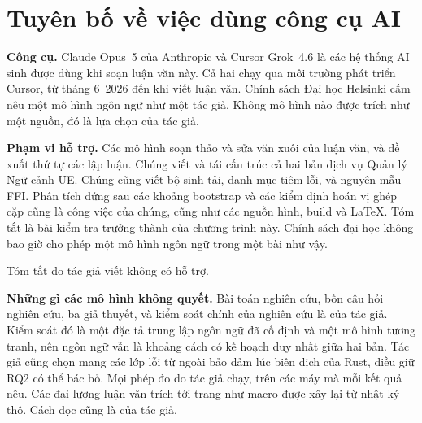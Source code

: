 \newif\ifabstractunaided
\abstractunaidedtrue
\ifabstractunaided\else
  \GenericWarning{}{ai_statement: the abstract has not been rewritten unaided.
    Not submittable. Set \noexpand\abstractunaidedtrue in ai_statement.tex once it has}%
\fi

\cleardoublepage
{}
{}
\chapter*{Tuyên bố về việc dùng công cụ AI}

\noindent\textbf{Công cụ.} Claude Opus~5 của Anthropic và Cursor Grok~4.6 là các hệ thống AI
sinh được dùng khi soạn luận văn này. Cả hai chạy qua môi trường phát triển Cursor, từ tháng
6~2026 đến khi viết luận văn. Chính sách Đại học Helsinki cấm nêu một mô hình ngôn ngữ như một
tác giả. Không mô hình nào được trích như một nguồn, đó là lựa chọn của tác giả.

\noindent\textbf{Phạm vi hỗ trợ.} Các mô hình soạn thảo và sửa văn xuôi của luận văn, và đề xuất
thứ tự các lập luận. Chúng viết và tái cấu trúc cả hai bản dịch vụ Quản lý Ngữ cảnh UE. Chúng
cũng viết bộ sinh tải, danh mục tiêm lỗi, và nguyên mẫu FFI. Phân tích đứng sau các khoảng
bootstrap và các kiểm định hoán vị ghép cặp cũng là công việc của chúng, cũng như các nguồn hình,
build và LaTeX. Tóm tắt là bài kiểm tra trưởng thành của chương trình này. Chính sách đại học
không bao giờ cho phép một mô hình ngôn ngữ trong một bài như vậy.
\ifabstractunaided
Tóm tắt do tác giả viết không có hỗ trợ.
\else
Trong bản thảo này nó chưa được viết lại không có hỗ trợ, và tuyên bố này sẽ nói vậy cho đến khi
đã được viết lại.
\fi

\noindent\textbf{Những gì các mô hình không quyết.} Bài toán nghiên cứu, bốn câu hỏi nghiên cứu,
ba giả thuyết, và kiểm soát chính của nghiên cứu là của tác giả. Kiểm soát đó là một đặc tả trung
lập ngôn ngữ đã cố định và một mô hình tương tranh, nên ngôn ngữ vẫn là khoảng cách có kế hoạch
duy nhất giữa hai bản. Tác giả cũng chọn mang các lớp lỗi từ ngoài bảo đảm lúc biên dịch của
Rust, điều giữ RQ2 có thể bác bỏ. Mọi phép đo do tác giả chạy, trên các máy mà mỗi kết quả nêu.
Các đại lượng luận văn trích tới trang như macro được xây lại từ nhật ký thô. Cách đọc cũng là
của tác giả.

